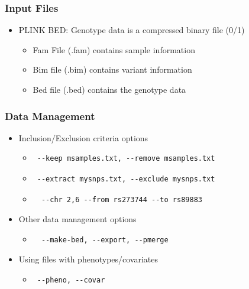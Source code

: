 \documentclass{beamer}
\begin{document}
\begin{frame}
\frametitle{\bf Input Files}
\begin{itemize}
\item PLINK BED: Genotype data is a compressed binary file (0/1)
\begin{itemize}
\item Fam File (.fam)  contains sample information
\item Bim file (.bim) contains variant information
\item Bed file (.bed) contains the genotype data
\end{itemize}
\end{itemize}
\end{frame}


\begin{frame}[fragile]
\frametitle{\bf Data Management}
\begin{itemize}
\item Inclusion/Exclusion criteria options
\begin{itemize}
\item   \begin{verbatim} --keep msamples.txt, --remove msamples.txt  \end{verbatim}
\item \begin{verbatim} --extract mysnps.txt, --exclude mysnps.txt \end{verbatim}
\item \begin{verbatim}  --chr 2,6 --from rs273744 --to rs89883 \end{verbatim}
\end{itemize}
\item  Other data management options
\begin{itemize}
\item \begin{verbatim}  --make-bed, --export, --pmerge \end{verbatim}
\end{itemize}
\item Using files with phenotypes/covariates
\begin{itemize}
\item  \begin{verbatim} --pheno, --covar \end{verbatim}
\end{itemize}
\end{itemize}
\end{frame}
\end{document}
